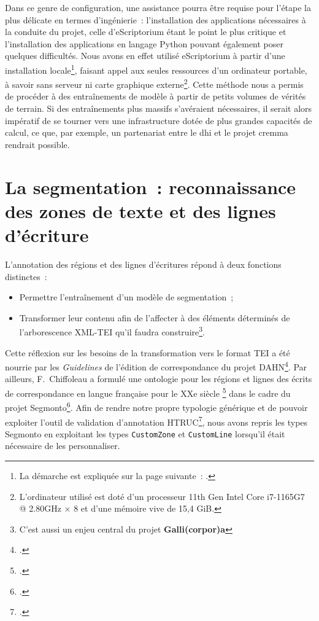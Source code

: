 \documentclass[a4paper,12pt,twoside]{book}
\begin{document}
			Dans ce genre de configuration, une assistance pourra être requise pour l'étape la plus délicate en termes d'ingénierie~: l'installation des applications nécessaires à la conduite du projet, celle d'eScriptorium étant le point le plus critique et l'installation des applications en langage Python pouvant également poser quelques difficultés. Nous avons en effet utilisé eScriptorium à partir d'une installation locale\footnote{La démarche est expliquée sur la page suivante~: \cite{DockerInstallInstallation}.}, faisant appel aux seules ressources d'un ordinateur portable, à savoir sans serveur ni carte graphique externe\footnote{L'ordinateur utilisé est doté d'un processeur 11th Gen Intel Core i7-1165G7 @ 2.80GHz × 8 et d'une mémoire vive de 15,4 GiB.}. Cette méthode nous a permis de procéder à des entraînements de modèle à partir de petits volumes de vérités de terrain. Si des entraînements plus massifs s'avéraient nécessaires, il serait alors impératif de se tourner vers une infrastructure dotée de plus grandes capacités de calcul, ce que, par exemple, un partenariat entre le \gls{dhi} et le projet \gls{cremma} rendrait possible.
						
		\section[La segmentation]{La segmentation~: reconnaissance des zones de texte et des lignes d'écriture}
			\label{lieu-segmentation}
			
			L'annotation des régions et des lignes d'écritures répond à deux fonctions distinctes~:
			
			\begin{itemize}
				\item Permettre l'entraînement d'un modèle de \gls{segmentation}~;
				\item Transformer leur contenu afin de l'affecter à des éléments déterminés de l'arborescence XML-TEI qu'il faudra construire\footnote{C'est aussi un enjeu central du projet \textbf{Galli(corpor)a}}.
			\end{itemize}

				Cette réflexion sur les besoins de la transformation vers le format TEI a été nourrie par les \textit{Guidelines} de l'édition de correspondance du projet DAHN\footcite{chiffoleauCorrespondenceGuidelines2022}. Par ailleurs, F.~Chiffoleau a formulé une ontologie pour les régions et lignes des écrits de correspondance en langue française pour le XXe siècle \footcite{chiffoleauCorrespondanceLangueFrancaise2021} dans le cadre du projet \gls{Segmonto}\footcite{gabaySegmOntoCommonVocabulary2021}. Afin de rendre notre propre typologie générique et de pouvoir exploiter l'outil de validation d'annotation HTRUC\footcite{clericeHTRUCHTRUnitedCatalog2021}, nous avons repris les types \gls{Segmonto} en exploitant les types \texttt{CustomZone} et \texttt{CustomLine} lorsqu'il était nécessaire de les personnaliser.
\end{document}
